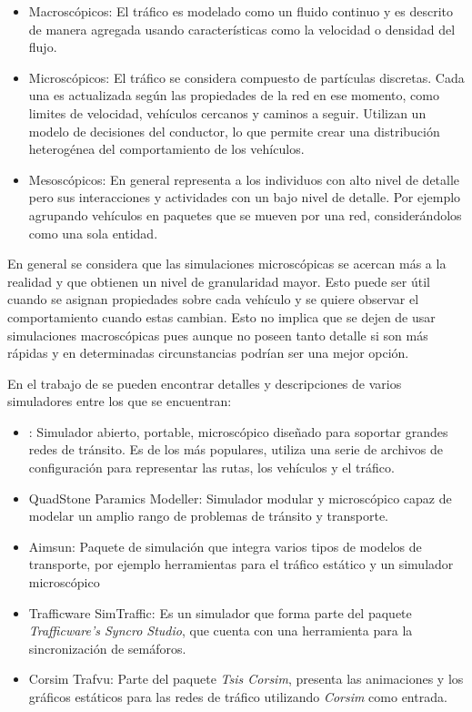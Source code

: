 \begin{itemize}
	\item Macroscópicos: El tráfico es modelado como un fluido continuo y es descrito de manera agregada usando características como la velocidad o densidad del flujo.
	\item Microscópicos: El tráfico se considera compuesto de partículas discretas. Cada una es actualizada según las propiedades de la red en ese momento, como limites de velocidad, vehículos cercanos y caminos a seguir. Utilizan un modelo de decisiones del conductor, lo que permite crear una distribución heterogénea del comportamiento de los vehículos.
	\item Mesoscópicos: En general representa a los individuos con alto nivel de detalle pero sus interacciones y actividades con un bajo nivel de detalle. Por ejemplo agrupando vehículos en paquetes que se mueven por una red, considerándolos como una sola entidad.
\end{itemize}

En general se considera que las simulaciones microscópicas se acercan más a la realidad y que obtienen un nivel de granularidad mayor. Esto puede ser útil cuando se asignan propiedades sobre cada vehículo y se quiere observar el comportamiento cuando estas cambian. Esto no implica que se dejen de usar simulaciones macroscópicas pues aunque no poseen tanto detalle si son más rápidas y en determinadas circunstancias podrían ser una mejor opción.

En el trabajo de \citet{review_trafico} se pueden encontrar detalles y descripciones de varios simuladores entre los que se encuentran:
\begin{itemize}
	\item \citet{SUMO}: Simulador abierto, portable, microscópico diseñado para soportar grandes redes de tránsito. Es de los más populares, utiliza una serie de archivos de configuración para representar las rutas, los vehículos y el tráfico.
	\item QuadStone Paramics Modeller: Simulador modular y microscópico capaz de modelar un amplio rango de problemas de tránsito y transporte.
	\item Aimsun: Paquete de simulación que integra varios tipos de modelos de transporte, por ejemplo herramientas para el tráfico estático y un simulador microscópico
	\item Trafficware SimTraffic: Es un simulador que forma parte del paquete \emph{Trafficware's Syncro Studio}, que cuenta con una herramienta para la sincronización de semáforos.
	\item Corsim Trafvu: Parte del paquete \emph{Tsis Corsim}, presenta las animaciones y los gráficos estáticos para las redes de tráfico utilizando \emph{Corsim} como entrada.
\end{itemize}


